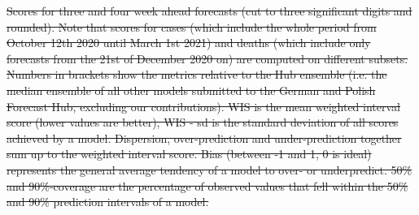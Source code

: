 \documentclass[10pt,letterpaper]{article}
\providecommand{\DIFdeltex}[1]{{\protect\color{red}\sout{#1}}}                      %
\providecommand{\DIFdelFL}[1]{\DIFdel{#1}} %
\providecommand{\DIFdel}[1]{\texorpdfstring{\DIFdeltex{#1}}{}} %
\begin{document}

{%
\DIFdelFL{Scores for three and four week ahead forecasts (cut to three significant digits and rounded). Note that scores for cases (which include the whole period from October 12th 2020 until March 1st 2021) and deaths (which include only forecasts from the 21st of December 2020 on) are computed on different subsets. Numbers in brackets show the metrics relative to the Hub ensemble (i.e. the median ensemble of all other models submitted to the German and Polish Forecast Hub, excluding our contributions). WIS is the mean weighted interval score (lower values are better), WIS - sd is the standard deviation of all scores achieved by a model. Dispersion, over-prediction and under-prediction together sum up to the weighted interval score. Bias (between -1 and 1, 0 is ideal) represents the general average tendency of a model to over- or underpredict. 50\% and 90\%-coverage are the percentage of observed values that fell within the 50\% and 90\% prediction intervals of a model.}%
\DIFdelFL{\hspace{\textwidth}}}
\end{document}
